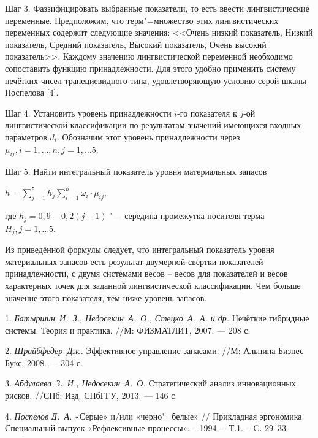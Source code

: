 Шаг 3.
Фаззифицировать выбранные показатели, то есть ввести лингвистические переменные.
Предположим, что терм"=множество этих лингвистических переменных содержит следующие значения: <<Очень низкий показатель, Низкий показатель, Средний показатель, Высокий показатель, Очень высокий показатель>>. Каждому значению лингвистической переменной необходимо сопоставить функцию принадлежности. Для этого удобно применить систему нечётких чисел трапециевидного типа, удовлетворяющую условию серой шкалы Поспелова [4].

Шаг 4.
Установить уровень принадлежности $i$-го показателя к $j$-ой лингвистической классификации по результатам значений имеющихся входных параметров $d_{i}$. Обозначим этот уровень принадлежности через $\mu_{ij}, i = 1, \ldots, n,  j = 1, \ldots 5$.

Шаг 5.
Найти интегральный показатель уровня материальных запасов
\begin{center}
$ h = \sum_{j = 1}^{5} h_{j} \sum_{i = 1}^{n} \omega_{i} \cdot \mu_{ij},$
\end{center}
где $h_{j} = 0,9 - 0,2(j - 1)$ "--- середина промежутка носителя терма $H_{j}, j = 1, \ldots 5$.

Из приведённой формулы следует, что  интегральный показатель уровня материальных запасов есть результат двумерной свёртки показателей принадлежности, с двумя системами весов – весов для показателей и весов характерных точек для заданной  лингвистической классификации. Чем больше значение этого показателя, тем ниже уровень запасов.



\litlist

1. {\it Батыршин~И.~З., Недосекин~А.~О., Стецко~А.~А. и др.} Нечёткие гибридные системы. Теория и
практика. //М: ФИЗМАТЛИТ, 2007. — 208 с.

2. {\it Шрайбфедер~Дж.} Эффективное управление запасами. //М: Альпина Бизнес Букс, 2008. — 304 с.

3. {\it Абдулаева~З.~И., Недосекин~А.~О.} Стратегический анализ инновационных рисков. //СПб: Изд. СПбГГУ, 2013. — 146 с.

4. {\it Поспелов Д.~А.} «Серые» и/или «черно"=белые» // Прикладная эргономика. Специальный выпуск  «Рефлексивные процессы». – 1994. – Т.1. – C. 29–33.
